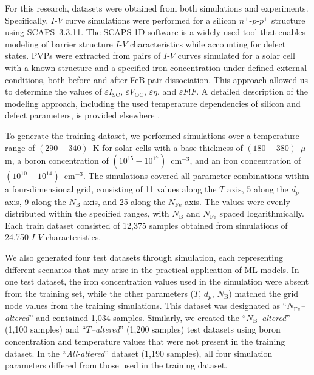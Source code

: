 \documentclass[a4paper,fleqn]{cas-sc}
\begin{document}
For this research, datasets were obtained from both simulations and experiments.
Specifically, $I$-$V$ curve simulations were performed for a silicon $n^+$-$p$-$p^+$ structure using SCAPS~3.3.11.
The SCAPS-1D software \cite{SCAPS1} is a widely used tool
\cite{MasumMia2025, Joshi2024, Ravidas2024, Liu2024, You2023, SCAPSDefect3}
that enables modeling of barrier structure $I$-$V$ characteristics while accounting for defect states.
PVPs were extracted from pairs of $I$-$V$ curves simulated for a solar cell with a known structure
and a specified iron concentration under defined external conditions, both before and after FeB pair dissociation.
This approach allowed us to determine the values of $\varepsilon I_\mathrm{SC}$, $\varepsilon V_\mathrm{OC}$, $\varepsilon \eta$, and $\varepsilon F!F$.
A detailed description of the modeling approach, including the used temperature dependencies of silicon and defect parameters,
is provided elsewhere \cite{Olikh2019SM, Olikh2025MSEB}.


To generate the training dataset, we performed simulations over a temperature range of $(290-340)$~K
for solar cells with a base thickness of $(180-380)$~$\mu$m,
a boron concentration of $(10^{15} - 10^{17})$~cm$^{-3}$, and an iron concentration of $(10^{10}-10^{14})$~cm$^{-3}$.
The simulations covered all parameter combinations within a four-dimensional grid, consisting of 11 values along the $T$ axis,
5 along the $d_p$ axis,
9 along the $N_\mathrm{B}$ axis, and 25 along the $N_\mathrm{Fe}$ axis.
The values were evenly distributed within the specified ranges, with $N_\mathrm{B}$ and $N_\mathrm{Fe}$ spaced logarithmically.
Each train dataset consisted of 12,375 samples obtained from simulations of 24,750 $I$-$V$ characteristics.

We also generated four test datasets through simulation,
each representing different scenarios that may arise in the practical application of ML models.
In one test dataset, the iron concentration values used in the simulation were absent from the training set,
while the other parameters ($T$, $d_p$, $N_\mathrm{B}$) matched the grid node values from the training simulations.
This dataset was designated as ``\textit{$N_\mathrm{Fe}$--altered}'' and contained 1,034 samples.
Similarly, we created the ``\textit{$N_\mathrm{B}$--altered}'' (1,100 samples) and ``\textit{$T$--altered}'' (1,200 samples)
test datasets using boron concentration and temperature values that were not present in the training dataset.
In the ``\textit{All-altered}'' dataset (1,190 samples), all four simulation parameters differed from those used in the training dataset.
\end{document}
